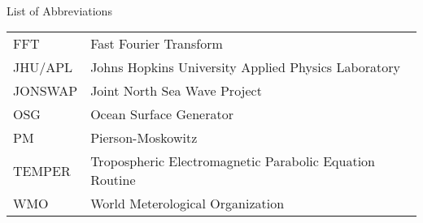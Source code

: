 

\renewcommand{\baselinestretch}{1}
\small\normalsize
\hbox{\ }

\vspace{-4em}

\begin{center}
\large{List of Abbreviations}
\end{center} 

\vspace{3pt}

\begin{supertabular}{ll}
FFT & Fast Fourier Transform \\
JHU/APL & Johns Hopkins University Applied Physics Laboratory \\
JONSWAP & Joint North Sea Wave Project\\
OSG & Ocean Surface Generator \\
PM & Pierson-Moskowitz \\
TEMPER & Tropospheric Electromagnetic Parabolic Equation Routine \\
WMO & World Meterological Organization \\
\end{supertabular}
